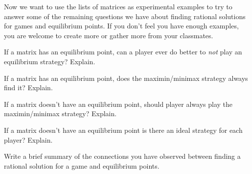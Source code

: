 Now we want to use the lists of matrices as experimental examples to try to answer some of the remaining questions we have about finding rational solutions for games and equilibrium points. If you don't feel you have enough examples, you are welcome to create more or gather more from your classmates.


\begin{xca}
If a matrix has an equilibrium point, can a player ever do better to {\it not} play an equilibrium strategy? Explain.%
\end{xca}

\begin{xca} 
If a matrix has an equilibrium point, does the maximin/minimax strategy always find it? Explain.
\end{xca}

\begin{xca}
If a matrix doesn't have an equilibrium point, should  player always play the maximin/minimax strategy? Explain.
\end{xca}

\begin{xca}
If a matrix doesn't have an equilibrium point is there an ideal strategy for each player? Explain.
\end{xca}

\begin{xca}
Write a brief summary of the connections you have observed between finding a rational solution for a game and equilibrium points. 
\end{xca}







 